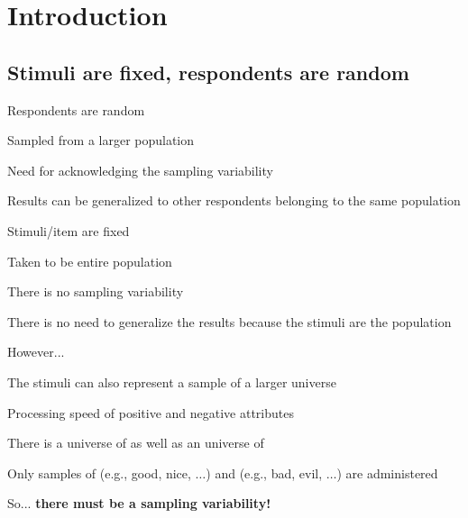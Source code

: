\documentclass[compress]{beamer}
\begin{document}
\section{Introduction}

\subsection{Stimuli are fixed, respondents are random}

\begin{frame}
	
	\begin{block}{Respondents are random}
		
		Sampled from a larger population
		
		\vspace{1.5mm}
		\pause
		Need for acknowledging the sampling variability 
		
		\vspace{1.5mm}
		\pause
		Results can be generalized to other respondents belonging to the same population
	\end{block}

\vspace{3mm}
\pause
\begin{block}{Stimuli/item are fixed}
	
	Taken to be entire population 
	
		\vspace{1.5mm}
	\pause
	There is no sampling variability
	
		\vspace{1.5mm}
	\pause
	There is no need to generalize the results because the stimuli are the population
	
\end{block}
\end{frame}

\begin{frame}{However...}
	
	The stimuli can also represent a sample of a larger universe
	
	\vspace{3mm}
	\pause
	
	\begin{exampleblock}{Processing speed of positive and negative attributes}
		
		\pause
		\vspace{1.5mm}
		There is a universe of {} as well as an universe of {}
		
		\pause
		\vspace{1.5mm}
		Only samples of {} (e.g., good, nice, $\ldots$) and {} (e.g., bad, evil, $\ldots$) are administered 
		
		\pause
		\vspace{2.5mm}
		So... \textbf{there must be a sampling variability!} 
	\end{exampleblock}
\end{frame}
\end{document}
